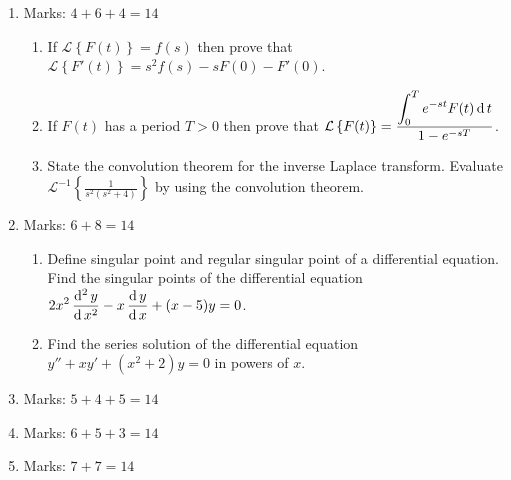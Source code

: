 \documentclass[../main-sheet.tex]{subfiles}
\newcommand{\lap}[1]{\mathcal{L}\left\{ #1\right\}}
\newcommand{\ilap}[1]{\mathcal{L}^{-1}\left\{ #1\right\}}
\begin{document}
\begin{enumerate}
    \item Marks: $ 4+6+4=14 $
    \begin{enumerate}
        \item If $ \lap{F(t)}=f(s) $ then prove that $ \lap{F'(t)}=s^2f(s)-sF(0)-F'(0) $.
        \item If $ F(t) $ has a period $ T>0 $ then prove that $\displaystyle \lap{F(t)}=\frac{\displaystyle \int_0^T e^{-st}F(t)\D t}{1-e^{-sT}} $.
        \item State the convolution theorem for the inverse Laplace transform. Evaluate $ \ilap{\frac{1}{s^2(s^2+4)}} $ by using the convolution theorem.
    \end{enumerate}
    \item Marks: $ 6+8=14 $
    \begin{enumerate}
        \item Define singular point and regular singular point of a differential equation. Find the singular points of the differential equation $ \displaystyle 2x^2\,\frac{\mathrm{d}^{2}\, y}{\mathrm{d}\, x^{2}}-x\,\frac{\mathrm{d}\,y}{\mathrm{d}\,x}+(x-5)y=0 $.
        \item Find the series solution of the differential equation $ y''+xy'+(x^2+2)y=0 $ in powers of $ x $.
    \end{enumerate}
    \item Marks: $ 5+4+5=14 $
    \item Marks: $ 6+5+3=14 $
    \item Marks: $ 7+7=14 $
\end{enumerate}
\end{document}
